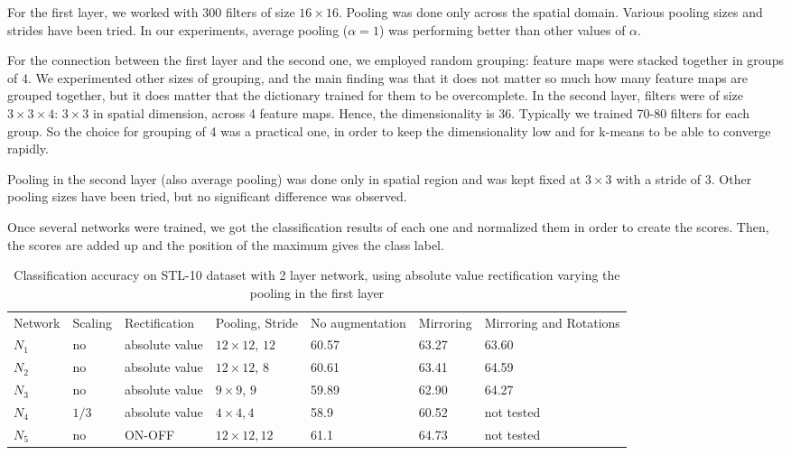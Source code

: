 \documentclass[runningheads]{llncs}
\begin{document}
For the first layer, we worked with 300 filters of size $16 \times 16$. 
Pooling was done only across the spatial domain. Various pooling sizes and strides have been tried.
In our experiments, average pooling ($\alpha =1$) was performing better than other values of $\alpha$.

For the connection between the first layer and the second one, we employed random grouping: feature maps were stacked together in groups of 4. We experimented other sizes of grouping, and the main finding was that it does not matter so much how many feature maps are grouped together, but it does matter that the dictionary trained for them to be overcomplete.
In the second layer, filters were of size $3 \times 3 \times 4$: $3\times 3$ in spatial dimension, across 4 feature maps. Hence, the dimensionality is 36. Typically we trained 70-80 filters for each group. So the choice for grouping of 4 was a practical one, in order to keep the dimensionality low and for k-means to be able to converge rapidly.

Pooling in the second layer (also average pooling) was done only in spatial region and was kept fixed at $3\times 3$ with a stride of 3. Other pooling sizes have been tried, but no significant difference was observed. 


Once several networks were trained, we got the classification results of each one and normalized them in order to create the scores. Then, the scores are added up and the position of the maximum gives the class label.

\setlength{\tabcolsep}{4pt}
\begin{table}
\begin{center}
\caption{Classification accuracy on STL-10 dataset with 2 layer network, using absolute value rectification varying the pooling in the first layer}
\begin{tabular}{l|l|l|l|l|l|p{2cm}}
\hline\noalign{\smallskip}
Network & Scaling & Rectification & Pooling, Stride & No augmentation & Mirroring & Mirroring and Rotations\\
\noalign{\smallskip}
\hline
\noalign{\smallskip}
$N_1$ & no & absolute value & $12\times 12$, $12$ & 60.57 & 63.27 & 63.60\\
\hline
$N_2$ & no & absolute value & $12\times 12$, $8$ & 60.61 & 63.41 & 64.59 \\
\hline
$N_3$ & no & absolute value &$9\times 9$, $9$ & 59.89  & 62.90  &  64.27  \\
\hline
$N_4$ & $1/3$ & absolute value & $4\times 4, 4$ & 58.9 & 60.52 & not tested \\
\hline
$N_5$ & no & ON-OFF & $12\times 12, 12$ & 61.1 & 64.73 & not tested \\
\hline

\end{tabular}
\end{center}
\end{table}
\setlength{\tabcolsep}{1.4pt}
\end{document}
